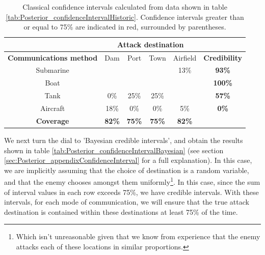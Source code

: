 \documentclass[11pt,fullpage]{book}
\begin{document}
\begin{table}[htbp]
  \centering
    \begin{tabular}{cccccc}
    \toprule
          & \multicolumn{4}{c}{\textbf{Attack destination}} & \multicolumn{1}{c}{\textbf{}} \\
    \midrule
    \textbf{Communications method} & Dam & Port & Town & Airfield   & \textbf{Credibility} \\
    Submarine & \color{red}{$[$73\%}  & \color{red}{50\%}  & \color{red}{50\%$]$}  & 13\%  & \textbf{93\%} \\
    Boat  & \color{red}{$[$9\%}   & \color{red}{25\%}  & \color{red}{25\%}  & \color{red}{16\%$]$}  & \textbf{100\%} \\
    Tank  & 0\%   & 25\%  & 25\%  & \color{red}{$[$66\%$]$}  & \textbf{57\%} \\
    Aircraft & 18\%   & 0\%  & 0\%   & 5\%   & \textbf{0\%} \\
    \bottomrule
    \textbf{Coverage} & \textbf{82\%}  & \textbf{75\%}  & \textbf{75\%}  & \textbf{82\%} &  \\
    \end{tabular}%
  \caption{Classical confidence intervals calculated from data shown in table \ref{tab:Posterior_confidenceIntervalHistoric}. Confidence intervals greater than or equal to 75\% are indicated in red, surrounded by parentheses.}\label{tab:Posterior_confidenceIntervalClassical}%
\end{table}%

We next turn the dial to 'Bayesian credible intervals', and obtain the results shown in table \ref{tab:Posterior_confidenceIntervalBayesian} (see section \ref{sec:Posterior_appendixConfidenceInterval} for a full explanation). In this case, we are implicitly assuming that the choice of destination is a random variable, and that the enemy chooses amongst them uniformly\footnote{Which isn't unreasonable given that we know from experience that the enemy attacks each of these locations in similar proportions.}. In this case, since the sum of interval values in each row exceeds 75\%, we have credible intervals. With these intervals, for each mode of communication, we will ensure that the true attack destination is contained within these destinations at least 75\% of the time.
\end{document}
